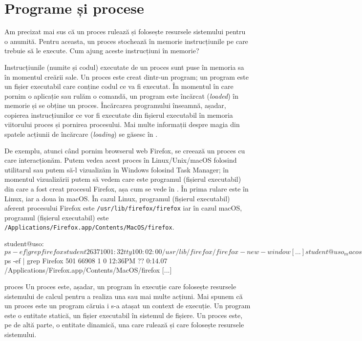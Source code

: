 \section{Programe și procese}
\label{sec:process:process-program}

Am precizat mai sus că un proces rulează și folosește resursele sistemului pentru o anumită.
Pentru aceasta, un proces stochează în memorie instrucțiunile pe care trebuie să le execute.
Cum ajung aceste instrucțiuni în memorie?

Instrucțiunile (numite și codul) executate de un proces sunt puse în memoria sa în momentul creării sale.
Un proces este creat dintr-un program;
un program este un fișier executabil care conține codul ce va fi executat.
În momentul în care pornim o aplicație sau rulăm o comandă, un program este încărcat (\textit{loaded}) în memorie și se obține un proces.
Încărcarea programului înseamnă, așadar, copierea instrucțiunilor ce vor fi executate din fișierul executabil în memoria viitorului proces și pornirea procesului.
Mai multe informații despre magia din spatele acțiunii de încărcare (\textit{loading}) se găsesc în .

De exemplu, atunci când pornim browserul web Firefox, se creează un proces cu care interacționăm.
Putem vedea acest proces în Linux/Unix/macOS folosind utilitarul  sau putem să-l vizualizăm în Windows folosind Task Manager;
în momentul vizualizării putem să vedem care este programul (fișierul executabil) din care a fost creat procesul Firefox, așa cum se vede în .
În  prima rulare este în Linux, iar a doua în macOS.
În cazul Linux, programul (fișierul executabil) aferent procesului Firefox este \texttt{/usr/lib/firefox/firefox} iar în cazul macOS, programul (fișierul executabil) este \texttt{/Applications/Firefox.app/Contents/MacOS/firefox}.

\begin{screen}[caption={Fișierul executabil al unui process},label={lst:process:exec-for-process}]
student@uso:~$ ps -ef | grep firefox
student   2637     1  0 01:32 tty1     00:02:00 /usr/lib/firefox/firefox -new-window
[...]
student@uso_macos:~$ ps -ef | grep Firefox
501 66908     1   0 12:36PM ??         0:14.07 /Applications/Firefox.app/Contents/MacOS/firefox
[...]
\end{screen}

\begin{definition}{proces}
  Un proces este, așadar, un program în execuție care folosește resursele sistemului de calcul pentru a realiza una sau mai multe acțiuni.
  Mai spunem că un proces este un program căruia i s-a atașat un context de execuție.
  Un program este o entitate statică, un fișier executabil în sistemul de fișiere.
  Un proces este, pe de altă parte, o entitate dinamică, una care rulează și care folosește resursele sistemului.
\end{definition}

